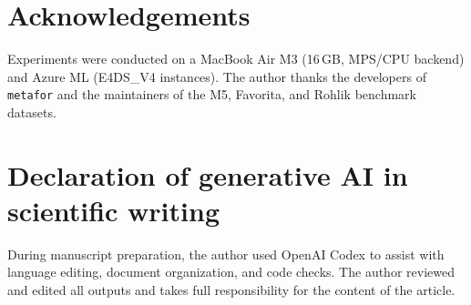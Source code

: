 \documentclass[preprint,12pt,authoryear]{elsarticle}
\begin{document}
\ifdefined\anonymoussubmission
\else
\section*{Acknowledgements}
Experiments were conducted on a MacBook Air M3 (16\,GB, MPS/CPU backend)
and Azure ML (E4DS\_V4 instances).  The author thanks
the developers of \texttt{metafor} \citep{viechtbauer2010metafor}
and the maintainers of the M5, Favorita, and Rohlik benchmark
datasets.
\fi

\section*{Declaration of generative AI in scientific writing}
During manuscript preparation, the author used OpenAI Codex to assist with
language editing, document organization, and code checks.  The author reviewed
and edited all outputs and takes full responsibility for the content of the
article.



\end{document}
